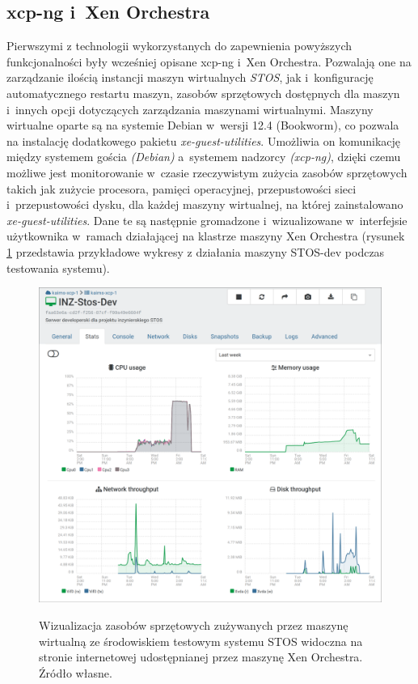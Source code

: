 \subsection{xcp-ng i~Xen Orchestra}
Pierwszymi z technologii wykorzystanych do zapewnienia powyższych funkcjonalności były wcześniej opisane xcp-ng i~Xen Orchestra. Pozwalają one na zarządzanie ilością instancji maszyn wirtualnych \textit{STOS}, jak i~konfigurację automatycznego restartu maszyn, zasobów sprzętowych dostępnych dla maszyn i~innych opcji dotyczących zarządzania maszynami wirtualnymi\cite{xoa, xcp}. Maszyny wirtualne oparte są na systemie Debian w~wersji 12.4 (Bookworm), co pozwala na instalację dodatkowego pakietu \textit{xe-guest-utilities}\cite{xe-guest}. Umożliwia on komunikację między systemem gościa \textit{(Debian)} a~systemem nadzorcy \textit{(xcp-ng)}, dzięki czemu możliwe jest monitorowanie w~czasie rzeczywistym zużycia zasobów sprzętowych takich jak zużycie procesora, pamięci operacyjnej, przepustowości sieci i~przepustowości dysku, dla każdej maszyny wirtualnej, na której zainstalowano \textit{xe-guest-utilities}. Dane te są następnie gromadzone i~wizualizowane w~interfejsie użytkownika w~ramach działającej na klastrze maszyny Xen Orchestra (rysunek \ref{xcpGuest} przedstawia przykładowe wykresy z działania maszyny STOS-dev podczas testowania systemu).
\begin{figure}[!h]
	\begin{center}
		\resizebox{0.9\textwidth}{!} {
			\includegraphics{img/4/xe-dashboard.png}
		}
		\caption[Dashboard Xen Orchestra]{Wizualizacja zasobów sprzętowych zużywanych przez maszynę wirtualną ze środowiskiem testowym systemu STOS widoczna na stronie internetowej udostępnianej przez maszynę Xen Orchestra. Źródło własne.}
		\label{xcpGuest}
	\end{center}
\end{figure}
